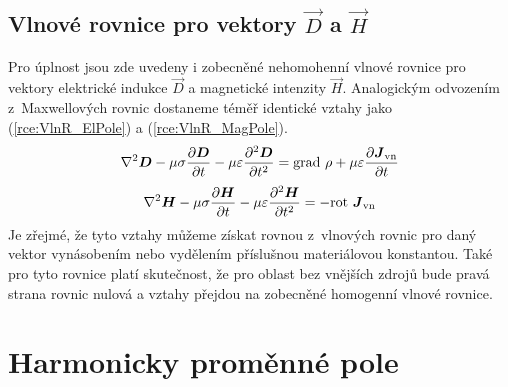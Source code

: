\subsection*{Vlnové rovnice pro vektory $\vec D$ a $\vec H$}
Pro úplnost jsou zde uvedeny i zobecněné nehomohenní vlnové rovnice pro vektory elektrické indukce $\vec D$ a magnetické intenzity $\vec H$. Analogickým odvozením z~Maxwellových rovnic dostaneme téměř identické vztahy jako (\ref{rce:VlnR_ElPole}) a (\ref{rce:VlnR_MagPole}). 
\begin{displaymath}
	\nabla^{2}\mbox{\boldmath$D$} -\mu\sigma\frac{\partial\mbox{\boldmath$D$}}{\partial t}-\mu\varepsilon\frac{\partial^{2}\mbox{\boldmath$D$}}{\partial t^{2}} = \mathrm{grad}\ \rho + \mu\varepsilon\frac{\partial\mbox{\boldmath$J$}_{\mathrm{vn}}}{\partial t}
\end{displaymath}
\begin{displaymath}
	\nabla^{2}\mbox{\boldmath$H$} -\mu\sigma\frac{\partial\mbox{\boldmath$H$}}{\partial t}-\mu\varepsilon\frac{\partial^{2}\mbox{\boldmath$H$}}{\partial t^{2}}= -\mathrm{rot}\ \mbox{\boldmath$J$}_{\mathrm{vn}}
\end{displaymath}
Je zřejmé, že tyto vztahy můžeme získat rovnou z~vlnových rovnic pro daný vektor vynásobením nebo vydělením příslušnou materiálovou konstantou. Také pro tyto rovnice platí skutečnost, že pro oblast bez vnějších zdrojů bude pravá strana rovnic nulová a vztahy přejdou na zobecněné homogenní vlnové rovnice.

\section{Harmonicky proměnné pole} \label{sec:Odvozeni_HarmPole}

